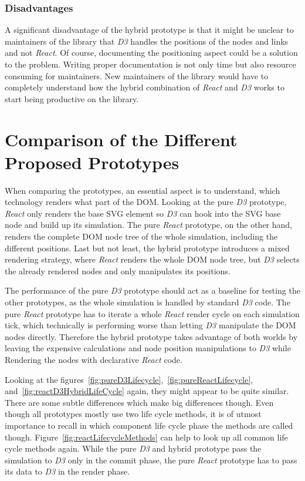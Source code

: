\subsubsection{Disadvantages}
\label{subsub:hybridDisadvantages}

A significant disadvantage of the hybrid prototype is that it might be unclear to maintainers of the library that \emph{D3} handles the positions of the nodes and links and not \emph{React}. Of course, documenting the positioning aspect could be a solution to the problem. Writing proper documentation is not only time but also resource consuming for maintainers. New maintainers of the library would have to completely understand how the hybrid combination of \emph{React} and \emph{D3} works to start being productive on the library.

\section{Comparison of the Different Proposed Prototypes}

When comparing the prototypes, an essential aspect is to understand, which technology renders what part of the DOM. Looking at the pure \emph{D3} prototype, \emph{React} only renders the base SVG element so \emph{D3} can hook into the SVG base node and build up its simulation. The pure \emph{React} prototype, on the other hand, renders the complete DOM node tree of the whole simulation, including the different positions. Last but not least, the hybrid prototype introduces a mixed rendering strategy, where \emph{React} renders the whole DOM node tree, but \emph{D3} selects the already rendered nodes and only manipulates its positions.

The performance of the pure \emph{D3} prototype should act as a baseline for testing the other prototypes, as the whole simulation is handled by standard \emph{D3} code. The pure \emph{React} prototype has to iterate a whole \emph{React} render cycle on each simulation tick, which technically is performing worse than letting \emph{D3} manipulate the DOM nodes directly. Therefore the hybrid prototype takes advantage of both worlds by leaving the expensive calculations and node position manipulations to \emph{D3} while Rendering the nodes with declarative \emph{React} code.

Looking at the figures~\ref{fig:pureD3Lifecycle},~\ref{fig:pureReactLifecycle}, and~\ref{fig:reactD3HybridLifeCycle} again, they might appear to be quite similar. There are some subtle differences which make big differences though. Even though all prototypes mostly use two life cycle methods, it is of utmost importance to recall in which component life cycle phase the methods are called though. Figure~\ref{fig:reactLifecycleMethods} can help to look up all common life cycle methods again. While the pure \emph{D3} and hybrid prototype pass the simulation to \emph{D3} only in the commit phase, the pure \emph{React} prototype has to pass its data to \emph{D3} in the render phase.

